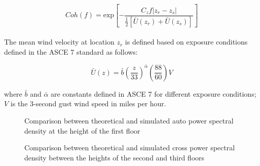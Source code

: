 \begin{equation}
Coh(f) = \text{exp}\left[-\frac{C_{z}f\lvert z_{r} -
       z_{s}\rvert}{\frac{1}{2}\left[\bar{U}(z_{r}) + \bar{U}(z_{s})\right]}\right]
\end{equation}\\

\noindent The mean wind velocity at location $z_{r}$ is defined based on exposure conditions
defined in the ASCE 7 standard as follows:

\begin{equation}
\bar{U}(z) = \bar{b} \left(\frac{z}{33}\right)^{\bar{\alpha}}\left(\frac{88}{60}\right)V
\end{equation}

\noindent where $\bar{b}$ and $\bar{\alpha}$ are constants defined in ASCE 7 for
different exposure conditions; $V$ is the 3-second gust wind speed in miles
per hour.

\begin{figure}[!htbp]
  \caption{Comparison between theoretical and simulated auto power
    spectral density at the height of the first floor}
  \label{fig:auto_corr}
\end{figure}

\begin{figure}[!htbp]
  \caption{Comparison between theoretical and simulated cross power
    spectral density between the heights of the second and third floors}
  \label{fig:cross_corr}
\end{figure}

